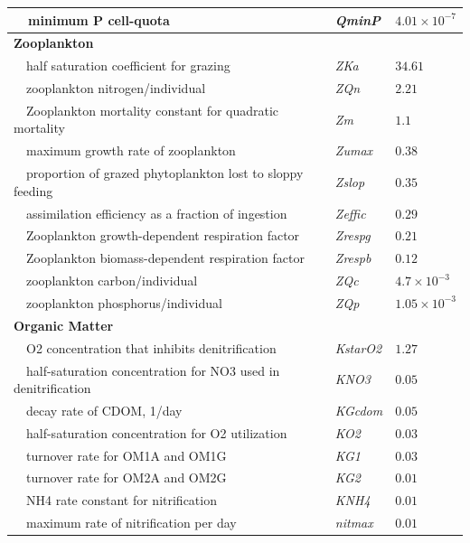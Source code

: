 \documentclass[letterpaper,12pt,oneside]{article}\usepackage[]{graphicx}\usepackage[]{color}
\begin{document}
\begin{table}[!tbp]
{\begin{center}
\begin{tabular}{lll}
~~minimum P cell-quota&\textit{QminP}&$4.01\times 10^{-7}$\tabularnewline
\hline
{\bfseries Zooplankton}&&\tabularnewline
~~half saturation coefficient for grazing&\textit{ZKa}&$34.61$\tabularnewline
~~zooplankton nitrogen/individual&\textit{ZQn}&$2.21$\tabularnewline
~~Zooplankton mortality constant for quadratic mortality&\textit{Zm}&$1.1$\tabularnewline
~~maximum growth rate of zooplankton&\textit{Zumax}&$0.38$\tabularnewline
~~proportion of grazed phytoplankton lost to sloppy feeding&\textit{Zslop}&$0.35$\tabularnewline
~~assimilation efficiency as a fraction of ingestion&\textit{Zeffic}&$0.29$\tabularnewline
~~Zooplankton growth-dependent respiration factor&\textit{Zrespg}&$0.21$\tabularnewline
~~Zooplankton biomass-dependent respiration factor&\textit{Zrespb}&$0.12$\tabularnewline
~~zooplankton carbon/individual&\textit{ZQc}&$4.7\times 10^{-3}$\tabularnewline
~~zooplankton phosphorus/individual&\textit{ZQp}&$1.05\times 10^{-3}$\tabularnewline
\hline
{\bfseries Organic Matter}&&\tabularnewline
~~O2 concentration that inhibits denitrification&\textit{KstarO2}&$1.27$\tabularnewline
~~half-saturation concentration for NO3 used in denitrification&\textit{KNO3}&$0.05$\tabularnewline
~~decay rate of CDOM, 1/day&\textit{KGcdom}&$0.05$\tabularnewline
~~half-saturation concentration for O2 utilization&\textit{KO2}&$0.03$\tabularnewline
~~turnover rate for OM1A and OM1G&\textit{KG1}&$0.03$\tabularnewline
~~turnover rate for OM2A and OM2G&\textit{KG2}&$0.01$\tabularnewline
~~NH4 rate constant for nitrification&\textit{KNH4}&$0.01$\tabularnewline
~~maximum rate of nitrification per day&\textit{nitmax}&$0.01$\tabularnewline
\hline
\end{tabular}\end{center}}

\end{table}
\end{document}
